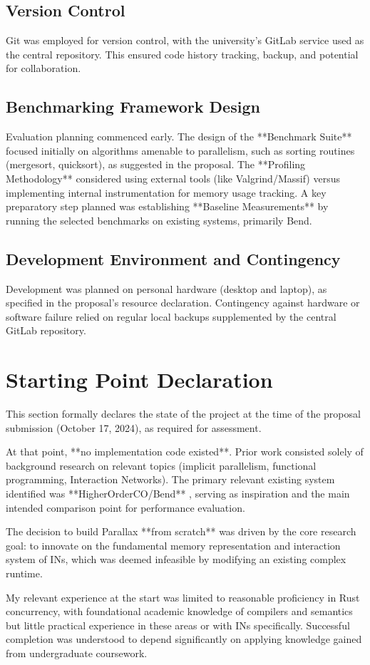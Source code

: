 \subsection{Version Control} %
Git was employed for version control, with the university's GitLab service used as the central repository. This ensured code history tracking, backup, and potential for collaboration.

\subsection{Benchmarking Framework Design} %
Evaluation planning commenced early. The design of the **Benchmark Suite** focused initially on algorithms amenable to parallelism, such as sorting routines (mergesort, quicksort), as suggested in the proposal. The **Profiling Methodology** considered using external tools (like Valgrind/Massif) versus implementing internal instrumentation for memory usage tracking. A key preparatory step planned was establishing **Baseline Measurements** by running the selected benchmarks on existing systems, primarily Bend.

\subsection{Development Environment and Contingency} %
Development was planned on personal hardware (desktop and laptop), as specified in the proposal's resource declaration. Contingency against hardware or software failure relied on regular local backups supplemented by the central GitLab repository.

\section{Starting Point Declaration} %

This section formally declares the state of the project at the time of the proposal submission (October 17, 2024), as required for assessment.

At that point, **no implementation code existed**. Prior work consisted solely of background research on relevant topics (implicit parallelism, functional programming, Interaction Networks). The primary relevant existing system identified was **HigherOrderCO/Bend** \cite{bend}, serving as inspiration and the main intended comparison point for performance evaluation.

The decision to build Parallax **from scratch** was driven by the core research goal: to innovate on the fundamental memory representation and interaction system of INs, which was deemed infeasible by modifying an existing complex runtime.

My relevant experience at the start was limited to reasonable proficiency in Rust concurrency, with foundational academic knowledge of compilers and semantics but little practical experience in these areas or with INs specifically. Successful completion was understood to depend significantly on applying knowledge gained from undergraduate coursework.

